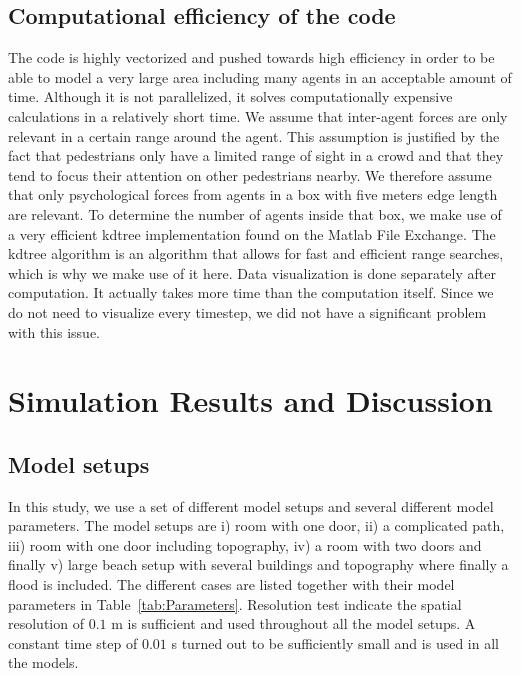 \documentclass[11pt]{article}
\begin{document}
\subsection{Computational efficiency of the code}
The code is highly vectorized and pushed towards high efficiency in order to be able to model a very large area including many agents in an acceptable amount of time. Although it is not parallelized, it solves computationally expensive calculations in a relatively short time. We assume that inter-agent forces are only relevant in a certain range around the agent. This assumption is justified by the fact that pedestrians only have a limited range of sight in a crowd and that they tend to focus their attention on other pedestrians nearby. We therefore assume that only psychological forces from agents in a box with five meters edge length are relevant. To determine the number of agents inside that box, we make use of a very efficient kdtree implementation found on the Matlab File Exchange. The kdtree algorithm is an algorithm that allows for fast and efficient range searches, which is why we make use of it here.
Data visualization is done separately after computation. It actually takes more time than the computation itself. Since we do not need to visualize every timestep, we did not have a significant problem with this issue.

\section{Simulation Results and Discussion}

\subsection{Model setups}

In this study, we use a set of different model setups and several different model parameters. The model setups are i) room with one door, ii) a complicated path, iii) room with one door including topography, iv) a room with two doors and finally v) large beach setup with several buildings and topography where finally a flood is included. The different cases are listed together with their model parameters in Table~\ref{tab:Parameters}. Resolution test indicate the spatial resolution of $0.1$ m is sufficient and used throughout all the model setups. A constant time step of $0.01$ s turned out to be sufficiently small and is used in all the models.

\end{document}
